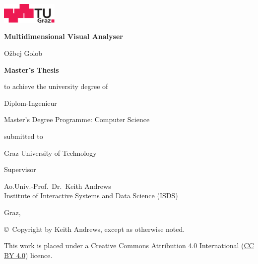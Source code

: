 \begin{center}
\includegraphics[height=1cm]{diagrams/tugraz-logo.pdf}

\vspace{2cm}

\begin{spacing}{1.1}
\huge\sffamily\bfseries
Multidimensional Visual Analyser
\end{spacing}

\vspace{2cm}

{\Large\sffamily Ožbej Golob}

\vspace{2cm}

{\Large\sffamily\bfseries Master's Thesis}

\vspace{5mm}

{\small\sffamily to achieve the university degree of}

\vspace{5mm}

{\normalsize\sffamily Diplom-Ingenieur}

\vspace{5mm}

{\normalsize\sffamily
Master's Degree Programme: Computer Science
}


\vspace{1cm}

{\small\sffamily submitted to}

\vspace{5mm}

{\large\sffamily Graz University of Technology}



\vspace{1cm}

{\small\sffamily Supervisor}

\vspace{5mm}

{\normalsize\sffamily
Ao.Univ.-Prof.\ Dr.\ Keith Andrews \\
Institute of Interactive Systems and Data Science (ISDS)
}


\vspace{1cm}

{\normalsize\sffamily Graz, \thisdate}



\vfill

{\footnotesize\sffamily \copyright~Copyright \thisyear{} by Keith Andrews,
except as otherwise noted.}

{\footnotesize\sffamily This work is placed under a
Creative Commons Attribution 4.0 International
(\href{https://creativecommons.org/licenses/by/4.0/}{CC BY 4.0}) licence.}


\end{center}




